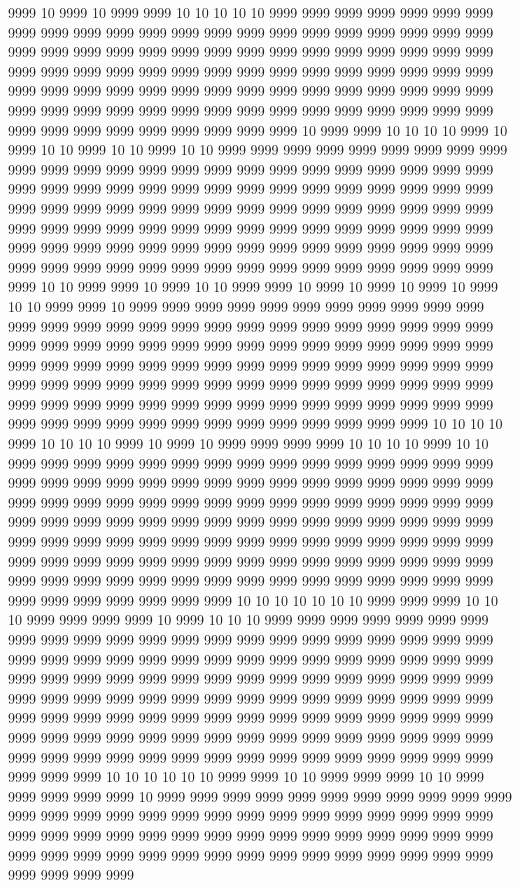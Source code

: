 9999 10 9999 10 9999 9999 10 10 10 10 10 9999 9999 9999 9999 9999 9999 9999 9999 9999 9999 9999 9999 9999 9999 9999 9999 9999 9999 9999 9999 9999 9999 9999 9999 9999 9999 9999 9999 9999 9999 9999 9999 9999 9999 9999 9999 9999 9999 9999 9999 9999 9999 9999 9999 9999 9999 9999 9999 9999 9999 9999 9999 9999 9999 9999 9999 9999 9999 9999 9999 9999 9999 9999 9999 9999 9999 9999 9999 9999 9999 9999 9999 9999 9999 9999 9999 9999 9999 9999 9999 9999 9999 9999 9999 9999 9999 9999 9999 9999 9999 9999 10 9999 9999 10 10 10 10 9999 10 9999 10 10 9999 10 10 9999 10 10 9999 9999 9999 9999 9999 9999 9999 9999 9999 9999 9999 9999 9999 9999 9999 9999 9999 9999 9999 9999 9999 9999 9999 9999 9999 9999 9999 9999 9999 9999 9999 9999 9999 9999 9999 9999 9999 9999 9999 9999 9999 9999 9999 9999 9999 9999 9999 9999 9999 9999 9999 9999 9999 9999 9999 9999 9999 9999 9999 9999 9999 9999 9999 9999 9999 9999 9999 9999 9999 9999 9999 9999 9999 9999 9999 9999 9999 9999 9999 9999 9999 9999 9999 9999 9999 9999 9999 9999 9999 9999 9999 9999 9999 9999 9999 9999 9999 9999 9999 9999 10 10 9999 9999 10 9999 10 10 9999 9999 10 9999 10 9999 10 9999 10 9999 10 10 9999 9999 10 9999 9999 9999 9999 9999 9999 9999 9999 9999 9999 9999 9999 9999 9999 9999 9999 9999 9999 9999 9999 9999 9999 9999 9999 9999 9999 9999 9999 9999 9999 9999 9999 9999 9999 9999 9999 9999 9999 9999 9999 9999 9999 9999 9999 9999 9999 9999 9999 9999 9999 9999 9999 9999 9999 9999 9999 9999 9999 9999 9999 9999 9999 9999 9999 9999 9999 9999 9999 9999 9999 9999 9999 9999 9999 9999 9999 9999 9999 9999 9999 9999 9999 9999 9999 9999 9999 9999 9999 9999 9999 9999 9999 9999 9999 9999 9999 9999 9999 9999 10 10 10 10 9999 10 10 10 10 9999 10 9999 10 9999 9999 9999 9999 10 10 10 10 9999 10 10 9999 9999 9999 9999 9999 9999 9999 9999 9999 9999 9999 9999 9999 9999 9999 9999 9999 9999 9999 9999 9999 9999 9999 9999 9999 9999 9999 9999 9999 9999 9999 9999 9999 9999 9999 9999 9999 9999 9999 9999 9999 9999 9999 9999 9999 9999 9999 9999 9999 9999 9999 9999 9999 9999 9999 9999 9999 9999 9999 9999 9999 9999 9999 9999 9999 9999 9999 9999 9999 9999 9999 9999 9999 9999 9999 9999 9999 9999 9999 9999 9999 9999 9999 9999 9999 9999 9999 9999 9999 9999 9999 9999 9999 9999 9999 9999 9999 9999 9999 9999 9999 9999 9999 9999 9999 9999 9999 9999 9999 9999 9999 9999 10 10 10 10 10 10 10 9999 9999 9999 10 10 10 9999 9999 9999 9999 10 9999 10 10 10 9999 9999 9999 9999 9999 9999 9999 9999 9999 9999 9999 9999 9999 9999 9999 9999 9999 9999 9999 9999 9999 9999 9999 9999 9999 9999 9999 9999 9999 9999 9999 9999 9999 9999 9999 9999 9999 9999 9999 9999 9999 9999 9999 9999 9999 9999 9999 9999 9999 9999 9999 9999 9999 9999 9999 9999 9999 9999 9999 9999 9999 9999 9999 9999 9999 9999 9999 9999 9999 9999 9999 9999 9999 9999 9999 9999 9999 9999 9999 9999 9999 9999 9999 9999 9999 9999 9999 9999 9999 9999 9999 9999 9999 9999 9999 9999 9999 9999 9999 9999 9999 9999 9999 9999 9999 9999 9999 9999 9999 9999 9999 9999 9999 9999 9999 10 10 10 10 10 10 9999 9999 10 10 9999 9999 9999 10 10 9999 9999 9999 9999 9999 10 9999 9999 9999 9999 9999 9999 9999 9999 9999 9999 9999 9999 9999 9999 9999 9999 9999 9999 9999 9999 9999 9999 9999 9999 9999 9999 9999 9999 9999 9999 9999 9999 9999 9999 9999 9999 9999 9999 9999 9999 9999 9999 9999 9999 9999 9999 9999 9999 9999 9999 9999 9999 9999 9999 9999 9999 9999 9999 9999 9999 